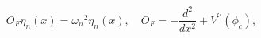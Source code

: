 \begin{equation}
\label{E13}
O_F\eta_n (x) = \omega_n{^2}\eta_n (x), \quad
O_F=-\frac{d^2}{dx^2}+ V^{\prime \prime}(\phi_c),
\end{equation}

